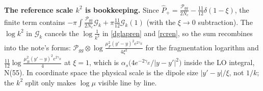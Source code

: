 \documentclass[10pt]{article}
\numberwithin{equation}{section}
\newcommand{\Ph}{\hat P}
\begin{document}
\textbf{The reference scale $k^2$ is bookkeeping.} Since $\Ph_+=\frac{\mathcal P_{gg}}{2N_c}-\frac{11}{12}\delta(1-\xi)$, the
finite term contains $-\pi\int\frac{\mathcal P_{gg}}{2N_c}\mathcal G_k+\pi\frac{11}{12}\mathcal G_k(1)$ (with the $\xi\to0$
subtraction). The $\log k^2$ in $\mathcal G_k$ cancels the $\log\frac{1}{k^2}$ in \eqref{dglapren} and \eqref{rcren}, so the sum recombines into
the note's forms: $\mathcal P_{gg}\otimes\log\frac{\mu_F^2(y'-y)^2e^{2\gamma_E}}{4\xi^2}$ for the fragmentation logarithm and
$\frac{11}{12}\log\frac{\mu_R^2(y'-y)^2e^{2\gamma_E}}{4}$ at $\xi=1$, which is $\alpha_s\big(4e^{-2\gamma_E}/|y-y'|^2\big)$ inside the
LO integral, N(55). In coordinate space the physical scale is the dipole size $|y'-y|/\xi$, not $1/k$; the $k^2$ split
only makes $\log\mu$ visible line by line.
\end{document}
